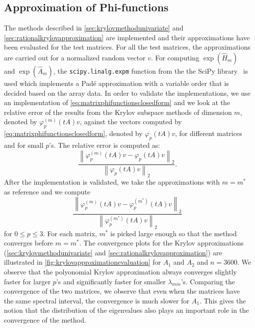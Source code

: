 \subsection{Approximation of Phi-functions}
The methods described in \autoref{sec:krylovmethodunivariate} and \autoref{sec:rationalkrylovapproximation}
are implemented and their approximations have been evaluated for the test matrices. For all the test matrices,
the approximations are carried out for a normalized random vector $v$.
For computing $\exp(\hat{H}_m)$ and $\exp(\hat{A}_m)$, the \texttt{scipy.linalg.expm} function from the the
SciPy library~\cite{SciPy2020} is used which implements a Padé approximation with a variable order that is
decided based on the array data.
In order to validate the implementations, we use an implementation of \eqref{eq:matrixphifunctionsclosedform}
and we look at the relative error of the results from the Krylov subspace methods of dimension $m$, denoted by
$\varphi_p^{(m)}(tA)v$, against the vectors computed by \eqref{eq:matrixphifunctionsclosedform},
denoted by $\varphi_p(tA)v$, for different matrices and for small $p$'s. The relative error is computed as:
\begin{equation*}
    \frac{\left\| \varphi_p^{(m)}(tA)v - \varphi_p(tA)v \right\|_2}{\left\| \varphi_p(tA)v\right\|_2}.
\end{equation*}
After the implementation is validated, we take the approximations with $m=m^*$ as reference and we compute
\begin{equation*}
    \frac{\left\| \varphi_p^{(m)}(tA)v - \varphi_p^{(m^*)}(tA)v \right\|_2}{\left\| \varphi_p^{(m^*)}(tA)v\right\|_2}
\end{equation*}
for $0 \le p \le 3$. For each matrix, $m^*$ is picked large enough so that the method converges before $m=m^*$.
The convergence plots for the Krylov approximations (\autoref{sec:krylovmethodunivariate} and \autoref{sec:rationalkrylovapproximation})
are illustrated in \autoref{fig:krylovapproximationevaluation} for $A_1$ and $A_2$ and $n=3600$.
We observe that the polyonomial Krylov approximation always converges slightly faster for larger $p$'s and significantly faster for smaller
$\lambda_{min}$'s. Comparing the convergence of the two matrices, we observe that even when the matrices have the
same spectral interval, the convergence is much slower for $A_1$. This gives the notion that the distribution of
the eigenvalues also plays an important role in the convergence of the method.

